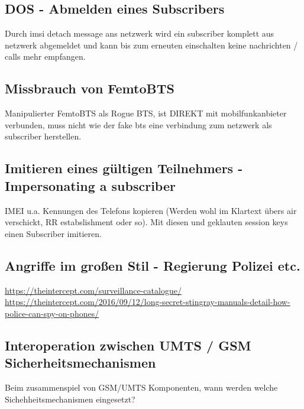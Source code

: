 \subsection{DOS - Abmelden eines Subscribers}
Durch imsi detach message ans netzwerk wird ein subscriber komplett aus netzwerk abgemeldet und kann bis zum erneuten einschalten keine nachrichten / calls mehr empfangen.

\subsection{Missbrauch von FemtoBTS}
Manipulierter FemtoBTS als Rogue BTS, ist DIREKT mit mobilfunkanbieter verbunden, muss nicht wie der fake bts eine verbindung zum netzwerk als subscriber herstellen.

\subsection{Imitieren eines gültigen Teilnehmers - Impersonating a subscriber}
IMEI u.a. Kennungen des Telefons kopieren (Werden wohl im Klartext übers air verschickt, RR estabslishment oder so). Mit diesen und geklauten session keys einen Subscriber imitieren.

\subsection{Angriffe im großen Stil - Regierung Polizei etc.}
\href{https://theintercept.com/surveillance-catalogue/}{https://theintercept.com/surveillance-catalogue/}\\
\href{https://theintercept.com/2016/09/12/long-secret-stingray-manuals-detail-how-police-can-spy-on-phones/}{https://theintercept.com/2016/09/12/long-secret-stingray-manuals-detail-how-police-can-spy-on-phones/}

\subsection{Interoperation zwischen UMTS / GSM Sicherheitsmechanismen}
Beim zusammenspiel von GSM/UMTS Komponenten, wann werden welche Sichehheitsmechanismen eingesetzt?

